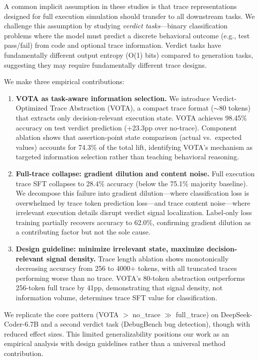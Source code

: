 \documentclass[11pt]{article}
\begin{document}
A common implicit assumption in these studies is that trace representations designed for full execution simulation should transfer to all downstream tasks. We challenge this assumption by studying \emph{verdict tasks}---binary classification problems where the model must predict a discrete behavioral outcome (e.g., test pass/fail) from code and optional trace information. Verdict tasks have fundamentally different output entropy (O(1) bits) compared to generation tasks, suggesting they may require fundamentally different trace designs.

We make three empirical contributions:

\begin{enumerate}
\item \textbf{VOTA as task-aware information selection.} We introduce Verdict-Optimized Trace Abstraction (VOTA), a compact trace format ($\sim$80 tokens) that extracts only decision-relevant execution state. VOTA achieves 98.45\% accuracy on test verdict prediction (+23.3pp over no-trace). Component ablation shows that assertion-point state comparison (actual vs.\ expected values) accounts for 74.3\% of the total lift, identifying VOTA's mechanism as targeted information selection rather than teaching behavioral reasoning.

\item \textbf{Full-trace collapse: gradient dilution and content noise.} Full execution trace SFT collapses to 28.4\% accuracy (below the 75.1\% majority baseline). We decompose this failure into gradient dilution---where classification loss is overwhelmed by trace token prediction loss---and trace content noise---where irrelevant execution details disrupt verdict signal localization. Label-only loss training partially recovers accuracy to 62.0\%, confirming gradient dilution as a contributing factor but not the sole cause.

\item \textbf{Design guideline: minimize irrelevant state, maximize decision-relevant signal density.} Trace length ablation shows monotonically decreasing accuracy from 256 to 4000+ tokens, with all truncated traces performing worse than no trace. VOTA's 80-token abstraction outperforms 256-token full trace by 41pp, demonstrating that signal density, not information volume, determines trace SFT value for classification.
\end{enumerate}

We replicate the core pattern (VOTA $>$ no\_trace $\gg$ full\_trace) on DeepSeek-Coder-6.7B and a second verdict task (DebugBench bug detection), though with reduced effect sizes. This limited generalizability positions our work as an empirical analysis with design guidelines rather than a universal method contribution.
\end{document}

